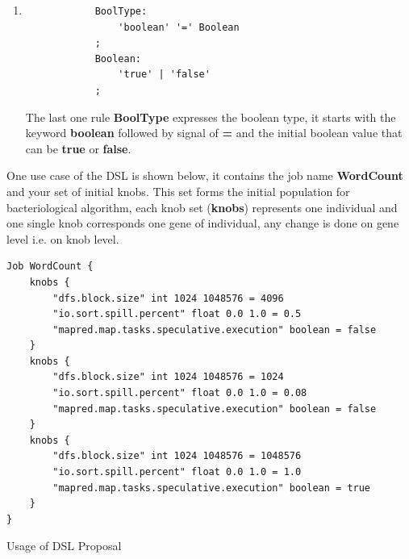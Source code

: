 \begin{enumerate}
	\item
		\singlespacing
		\begin{listing}[H]
		\begin{verbatim}
			BoolType:
				'boolean' '=' Boolean
			;
			Boolean:
				'true' | 'false' 
			;
		\end{verbatim}
		\label{listing:modelRule}
		\end{listing}

		The last one rule {\bf BoolType} expresses the boolean type, it starts with
		the keyword {\bf boolean} followed by signal of \textbf{=} and the initial
		boolean	value that can be {\bf true} or {\bf false}.

\end{enumerate}

One use case of the DSL is shown below, it contains the job name \textbf{WordCount}
and your set of initial knobs. This set forms the initial population for bacteriological
algorithm, each knob set ({\bf knobs}) represents one individual and one single
knob corresponds one gene of individual, any change is done on gene level i.e.
on knob level.

\singlespacing
\begin{listing}[H]
\begin{verbatim}
Job WordCount {
	knobs {
		"dfs.block.size" int 1024 1048576 = 4096
		"io.sort.spill.percent" float 0.0 1.0 = 0.5 
		"mapred.map.tasks.speculative.execution" boolean = false
	}
	knobs {
		"dfs.block.size" int 1024 1048576 = 1024
		"io.sort.spill.percent" float 0.0 1.0 = 0.08
		"mapred.map.tasks.speculative.execution" boolean = false
	}
	knobs {
		"dfs.block.size" int 1024 1048576 = 1048576
		"io.sort.spill.percent" float 0.0 1.0 = 1.0
		"mapred.map.tasks.speculative.execution" boolean = true
	}
}
\end{verbatim}
\caption{Usage of DSL Proposal} 
\label{listing:usageDSL}
\end{listing}

